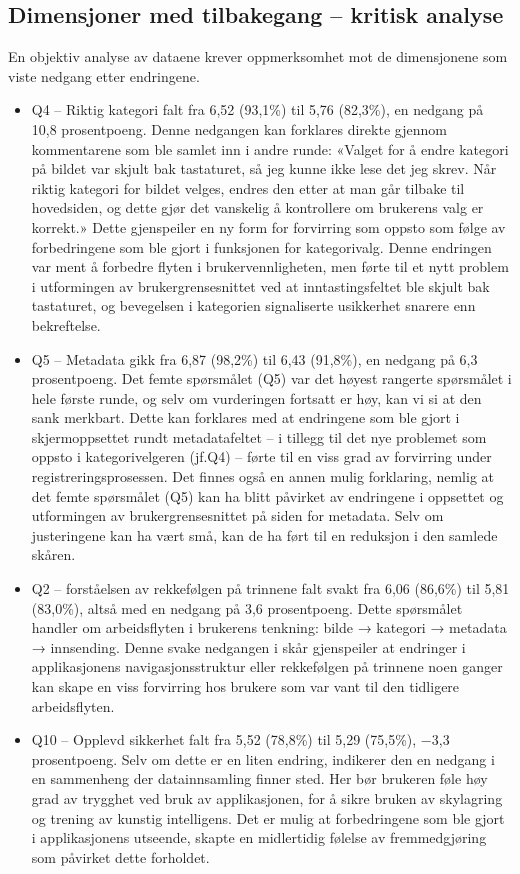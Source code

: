 \subsection{Dimensjoner med tilbakegang – kritisk analyse}
En objektiv analyse av dataene krever oppmerksomhet mot de dimensjonene som viste nedgang etter endringene.
\begin{itemize}
\item Q4 – Riktig kategori falt fra 6,52 (93,1\%) til 5,76 (82,3\%), en nedgang på 10,8 prosentpoeng. Denne nedgangen kan forklares direkte gjennom kommentarene som ble samlet inn i andre runde: «Valget for å endre kategori på bildet var skjult bak tastaturet, så jeg kunne ikke lese det jeg skrev. Når riktig kategori for bildet velges, endres den etter at man går tilbake til hovedsiden, og dette gjør det vanskelig å kontrollere om brukerens valg er korrekt.» Dette gjenspeiler en ny form for forvirring som oppsto som følge av forbedringene som ble gjort i funksjonen for kategorivalg. Denne endringen var ment å forbedre flyten i brukervennligheten, men førte til et nytt problem i utformingen av brukergrensesnittet ved at inntastingsfeltet ble skjult bak tastaturet, og bevegelsen i kategorien signaliserte usikkerhet snarere enn bekreftelse.
\item Q5 – Metadata gikk fra 6,87 (98,2\%) til 6,43 (91,8\%), en nedgang på 6,3 prosentpoeng. Det femte spørsmålet (Q5) var det høyest rangerte spørsmålet i hele første runde, og selv om vurderingen fortsatt er høy, kan vi si at den sank merkbart. Dette kan forklares med at endringene som ble gjort i skjermoppsettet rundt metadatafeltet – i tillegg til det nye problemet som oppsto i kategorivelgeren (jf.Q4) – førte til en viss grad av forvirring under registreringsprosessen. Det finnes også en annen mulig forklaring, nemlig at det femte spørsmålet (Q5) kan ha blitt påvirket av endringene i oppsettet og utformingen av brukergrensesnittet på siden for metadata. Selv om justeringene kan ha vært små, kan de ha ført til en reduksjon i den samlede skåren.
\item Q2 – forståelsen av rekkefølgen på trinnene falt svakt fra 6,06 (86,6\%) til 5,81 (83,0\%), altså med en nedgang på 3,6 prosentpoeng. Dette spørsmålet handler om arbeidsflyten i brukerens tenkning: bilde → kategori → metadata → innsending. Denne svake nedgangen i skår gjenspeiler at endringer i applikasjonens navigasjonsstruktur eller rekkefølgen på trinnene noen ganger kan skape en viss forvirring hos brukere som var vant til den tidligere arbeidsflyten.
\item Q10 – Opplevd sikkerhet falt fra 5,52 (78,8\%) til 5,29 (75,5\%), −3,3 prosentpoeng. Selv om dette er en liten endring, indikerer den en nedgang i en sammenheng der datainnsamling finner sted. Her bør brukeren føle høy grad av trygghet ved bruk av applikasjonen, for å sikre bruken av skylagring og trening av kunstig intelligens. Det er mulig at forbedringene som ble gjort i applikasjonens utseende, skapte en midlertidig følelse av fremmedgjøring som påvirket dette forholdet.
\end{itemize}

